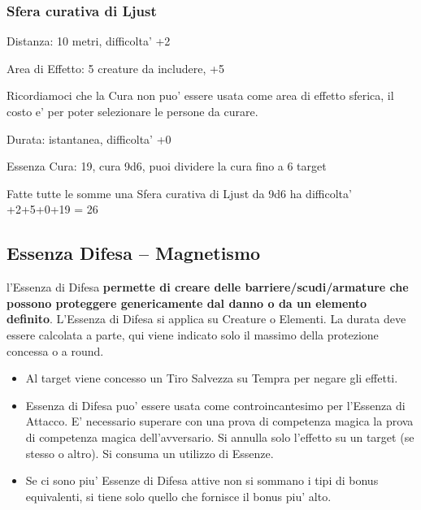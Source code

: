 \documentclass[a4paper,11pt,twoside,openany]{book}
\begin{document}
\subsubsection{Sfera curativa di Ljust}

Distanza: 10 metri, difficolta' +2

Area di Effetto: 5 creature da includere, +5

Ricordiamoci che la Cura non puo' essere usata come area di effetto sferica, il costo e' per poter selezionare le persone da curare.

Durata: istantanea, difficolta' +0

Essenza Cura: 19, cura 9d6, puoi dividere la cura fino a 6 target

Fatte tutte le somme una Sfera curativa di Ljust da 9d6 ha difficolta' +2+5+0+19 = 26

\pagebreak

\subsection{Essenza Difesa -- Magnetismo}

\label{essenza-difesa---magnetismo}

l'Essenza di Difesa \textbf{permette di creare delle barriere/scudi/armature che possono proteggere genericamente dal danno o da un elemento definito}. L'Essenza di Difesa si applica su Creature o Elementi. La durata deve essere calcolata a parte, qui viene indicato solo il massimo della protezione concessa o a round.
\begin{itemize}
\item 
Al target viene concesso un Tiro Salvezza su Tempra per negare gli effetti. 
\item 
Essenza di Difesa puo' essere usata come controincantesimo per l'Essenza di Attacco. E' necessario superare con una prova di competenza magica la prova di competenza magica dell'avversario. Si annulla solo l'effetto su un target (se stesso o altro). Si consuma un utilizzo di Essenze. 
\item 
Se ci sono piu' Essenze di Difesa attive non si sommano i tipi di bonus equivalenti, si tiene solo quello che fornisce il bonus piu' alto. 
\end{itemize}

\bigskip
\end{document}
